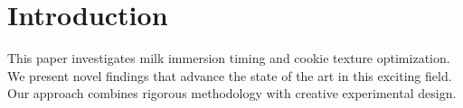 \section{Introduction}

This paper investigates milk immersion timing and cookie texture optimization. We present novel findings that advance the state of the art in this exciting field. Our approach combines rigorous methodology with creative experimental design.
